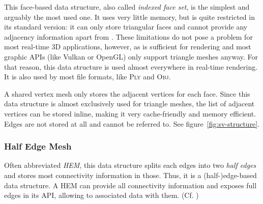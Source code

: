 This face-based data structure, also called \emph{indexed face set}, is the simplest and arguably the most used one.
It uses very little memory, but is quite restricted in its standard version:
it can only store triangular faces and cannot provide any adjacency information apart from .
These limitations do not pose a problem for most real-time 3D applications, however, as  is sufficient for rendering and most graphic APIs (like Vulkan or OpenGL) only support triangle meshes anyway.
For that reason, this data structure is used almost everywhere in real-time rendering.
It is also used by most file formats, like \textsc{Ply} and \textsc{Obj}.

A shared vertex mesh only stores the adjacent vertices for each face.
Since this data structure is almost exclusively used for triangle meshes, the list of adjacent vertices can be stored inline, making it very cache-friendly and memory efficient.
Edges are not stored at all and cannot be referred to. See figure~\ref{fig:sv-structure}.


\subsubsection*{Half Edge Mesh}

Often abbreviated \emph{HEM}, this data structure splits each edges into two \emph{half edges} and stores most connectivity information in those. Thus, it is a (half-)edge-based data structure.
A HEM can provide all connectivity information and exposes full edges in its API, allowing to associated data with them.
(Cf. \cite{mantyla1988introduction})

